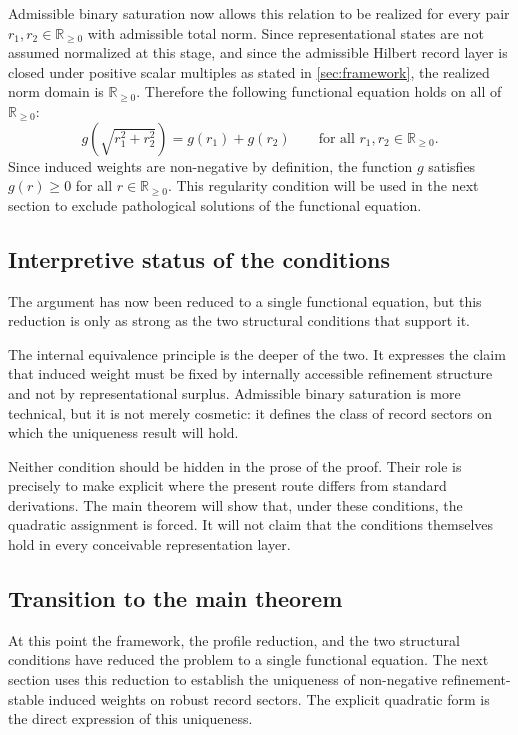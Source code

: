 \documentclass[11pt]{article}
\theoremstyle{remark}
\numberwithin{equation}{section}
\newcommand{\RR}{\mathbb{R}}
\begin{document}
Admissible binary saturation now allows this relation to be realized for every pair $r_1,r_2 \in \RR_{\geq 0}$ with admissible total norm. Since representational states are not assumed normalized at this stage, and since the admissible Hilbert record layer is closed under positive scalar multiples as stated in \cref{sec:framework}, the realized norm domain is \(\RR_{\geq 0}\). Therefore the following functional equation holds on all of $\RR_{\geq 0}$:
\begin{equation}
\label{eq:quadratic-functional-equation}
g\!\left(\sqrt{r_1^2+r_2^2}\right) = g(r_1) + g(r_2)
\qquad
\text{for all } r_1,r_2 \in \RR_{\geq 0}.
\end{equation}
Since induced weights are non-negative by definition, the function $g$ satisfies $g(r) \geq 0$ for all $r \in \RR_{\geq 0}$. This regularity condition will be used in the next section to exclude pathological solutions of the functional equation.

\subsection{Interpretive status of the conditions}

The argument has now been reduced to a single functional equation, but this reduction is only as strong as the two structural conditions that support it.

The internal equivalence principle is the deeper of the two. It expresses the claim that induced weight must be fixed by internally accessible refinement structure and not by representational surplus. Admissible binary saturation is more technical, but it is not merely cosmetic: it defines the class of record sectors on which the uniqueness result will hold.

Neither condition should be hidden in the prose of the proof. Their role is precisely to make explicit where the present route differs from standard derivations. The main theorem will show that, under these conditions, the quadratic assignment is forced. It will not claim that the conditions themselves hold in every conceivable representation layer.

\subsection{Transition to the main theorem}

At this point the framework, the profile reduction, and the two
structural conditions have reduced the problem to a single functional
equation. The next section uses this reduction to establish the
uniqueness of non-negative refinement-stable induced weights on robust
record sectors. The explicit quadratic form is the direct expression
of this uniqueness.
\end{document}
